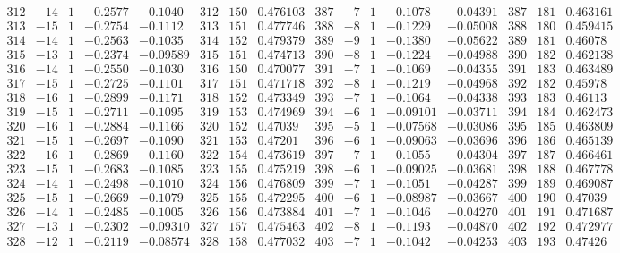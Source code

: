 \documentclass[11pt,reqno,a4letter]{article}
\numberwithin{figure}{section}
\numberwithin{table}{section}
\theoremstyle{plain}
\numberwithin{theorem}{section}
\theoremstyle{definition}
\begin{document}
\begin{table}[ht]
\begin{equation*}
{\begin{array}{ccccc|ccc|ccccc|ccc}
 312 & -14 & 1 & -0.2577 & -0.1040 & 312 & 150 & 0.476103 & 387 & -7 & 1 & -0.1078 & -0.04391 & 387 & 181 & 0.463161 \\
 313 & -15 & 1 & -0.2754 & -0.1112 & 313 & 151 & 0.477746 & 388 & -8 & 1 & -0.1229 & -0.05008 & 388 & 180 & 0.459415 \\
 314 & -14 & 1 & -0.2563 & -0.1035 & 314 & 152 & 0.479379 & 389 & -9 & 1 & -0.1380 & -0.05622 & 389 & 181 & 0.46078 \\
 315 & -13 & 1 & -0.2374 & -0.09589 & 315 & 151 & 0.474713 & 390 & -8 & 1 & -0.1224 & -0.04988 & 390 & 182 & 0.462138 \\
 316 & -14 & 1 & -0.2550 & -0.1030 & 316 & 150 & 0.470077 & 391 & -7 & 1 & -0.1069 & -0.04355 & 391 & 183 & 0.463489 \\
 317 & -15 & 1 & -0.2725 & -0.1101 & 317 & 151 & 0.471718 & 392 & -8 & 1 & -0.1219 & -0.04968 & 392 & 182 & 0.45978 \\
 318 & -16 & 1 & -0.2899 & -0.1171 & 318 & 152 & 0.473349 & 393 & -7 & 1 & -0.1064 & -0.04338 & 393 & 183 & 0.46113 \\
 319 & -15 & 1 & -0.2711 & -0.1095 & 319 & 153 & 0.474969 & 394 & -6 & 1 & -0.09101 & -0.03711 & 394 & 184 & 0.462473 \\
 320 & -16 & 1 & -0.2884 & -0.1166 & 320 & 152 & 0.47039 & 395 & -5 & 1 & -0.07568 & -0.03086 & 395 & 185 & 0.463809 \\
 321 & -15 & 1 & -0.2697 & -0.1090 & 321 & 153 & 0.47201 & 396 & -6 & 1 & -0.09063 & -0.03696 & 396 & 186 & 0.465139 \\
 322 & -16 & 1 & -0.2869 & -0.1160 & 322 & 154 & 0.473619 & 397 & -7 & 1 & -0.1055 & -0.04304 & 397 & 187 & 0.466461 \\
 323 & -15 & 1 & -0.2683 & -0.1085 & 323 & 155 & 0.475219 & 398 & -6 & 1 & -0.09025 & -0.03681 & 398 & 188 & 0.467778 \\
 324 & -14 & 1 & -0.2498 & -0.1010 & 324 & 156 & 0.476809 & 399 & -7 & 1 & -0.1051 & -0.04287 & 399 & 189 & 0.469087 \\
 325 & -15 & 1 & -0.2669 & -0.1079 & 325 & 155 & 0.472295 & 400 & -6 & 1 & -0.08987 & -0.03667 & 400 & 190 & 0.47039 \\
 326 & -14 & 1 & -0.2485 & -0.1005 & 326 & 156 & 0.473884 & 401 & -7 & 1 & -0.1046 & -0.04270 & 401 & 191 & 0.471687 \\
 327 & -13 & 1 & -0.2302 & -0.09310 & 327 & 157 & 0.475463 & 402 & -8 & 1 & -0.1193 & -0.04870 & 402 & 192 & 0.472977 \\
 328 & -12 & 1 & -0.2119 & -0.08574 & 328 & 158 & 0.477032 & 403 & -7 & 1 & -0.1042 & -0.04253 & 403 & 193 & 0.47426 \\

\end{array}}
\end{equation*}
\end{table}
\end{document}
